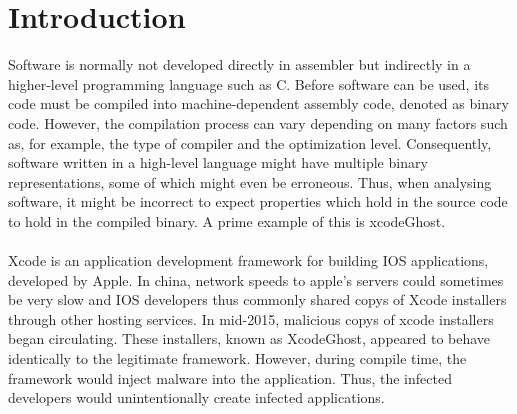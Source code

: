 \documentclass{kththesis}
\begin{document}
\listoffigures
\thispagestyle{empty}
 
\listoftables
\thispagestyle{empty}

\mainmatter
\cleardoublepage
{}


\chapter{Introduction}
%
Software is normally not developed directly in assembler but indirectly in a higher-level programming language such as C. Before software can be used, its code must be compiled into machine-dependent assembly code, denoted as binary code. However, the compilation process can vary depending on many factors such as, for example, the type of compiler and the optimization level. Consequently, software written in a high-level language might have multiple binary representations, some of which might even be erroneous\cite{preciseCFG}. Thus, when analysing software, it might be incorrect to expect properties which hold in the source code to hold in the compiled binary. A prime example of this is xcodeGhost.
\\ \\
Xcode is an application development framework for building IOS applications, developed by Apple\cite{Xcode}. In china, network speeds to apple's servers could sometimes be very slow and IOS developers thus commonly shared copys of Xcode installers through other hosting services\cite{XcodeGhost}. In mid-2015, malicious copys of xcode installers began circulating. These installers, known as XcodeGhost\cite{XcodeGhost}, appeared to behave identically to the legitimate framework. However, during compile time, the framework would inject malware into the application. Thus, the infected developers would unintentionally create infected applications. 
\end{document}

